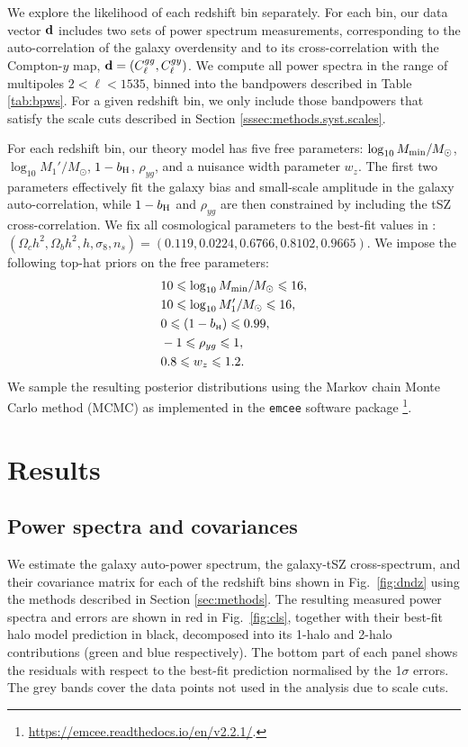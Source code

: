 \documentclass[useAMS,usenatbib]{mn2e}
\def\bH{b_{\scriptscriptstyle\rm H}}
\begin{document}
    We explore the likelihood of each redshift bin separately. For each bin, our data vector ${\bf d}$ includes two sets of power spectrum measurements, corresponding to the auto-correlation of the galaxy overdensity and to its cross-correlation with the Compton-$y$ map, ${\bf d}=(C^{gg}_\ell,C^{gy}_\ell)$. We compute all power spectra in the range of multipoles $2<\ell<1535$, binned into the bandpowers described in Table \ref{tab:bpws}. For a given redshift bin, we only include those bandpowers that satisfy the scale cuts described in Section \ref{sssec:methods.syst.scales}.

    For each redshift bin, our theory model has five free parameters: $\log_{10}M_{\rm min}/M_\odot$, $\log_{10}M_1'/M_\odot$, $1-b_{\rm H}$, $\rho_{yg}$, and a nuisance width parameter $w_z$. The first two parameters effectively fit the galaxy bias and small-scale amplitude in the galaxy auto-correlation, while $1-b_{\rm H}$ and $\rho_{yg}$ are then constrained by including the tSZ cross-correlation. We fix all cosmological parameters to the best-fit values in \cite{2018arXiv180706209P}: $(\Omega_c h^2,\Omega_bh^2,h,\sigma_8,n_s)=(0.119,0.0224,0.6766,0.8102,0.9665)$. We impose the following top-hat priors on the free parameters:
    \begin{align}
      &10\le\log_{10}M_{\rm min}/M_\odot\le16,\\
      &10\le\log_{10}M_1'/M_\odot\le16,\\
      &0\le(1-\bH)\le0.99,\\
      &-1\le\rho_{yg}\le1,\\
      &0.8\le w_z\le1.2.
    \end{align}
    We sample the resulting posterior distributions using the Markov chain Monte Carlo method (MCMC) as implemented in the {\tt emcee} software package \citep{2013PASP..125..306F}\footnote{\url{https://emcee.readthedocs.io/en/v2.2.1/}.}.

\section{Results}\label{sec:results}
  \subsection{Power spectra and covariances}\label{ssec:results.cls}
    We estimate the galaxy auto-power spectrum, the galaxy-tSZ cross-spectrum, and their covariance matrix for each of the redshift bins shown in Fig.\!~\ref{fig:dndz} using the methods described in Section \ref{sec:methods}. The resulting measured power spectra and errors are shown in red in Fig.\!~\ref{fig:cls}, together with their best-fit halo model prediction in black, decomposed into its 1-halo and 2-halo contributions (green and blue respectively). The bottom part of each panel shows the residuals with respect to the best-fit prediction normalised by the 1$\sigma$ errors. The grey bands cover the data points not used in the analysis due to scale cuts.
    
\end{document}
